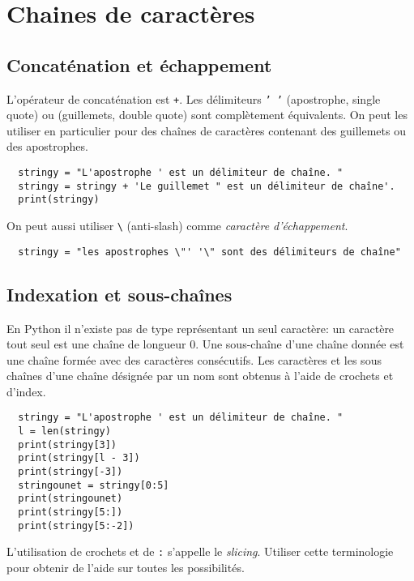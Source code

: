 \section{Chaines de caractères}
\subsection{Concaténation et échappement}
L'opérateur de concaténation est \texttt{+}. Les délimiteurs \texttt{' '} (apostrophe, single quote) ou  (guillemets, double quote) sont complètement équivalents. On peut les utiliser en particulier pour des chaînes de caractères contenant des guillemets ou des apostrophes.
\begin{verbatim}
  stringy = "L'apostrophe ' est un délimiteur de chaîne. " 
  stringy = stringy + 'Le guillemet " est un délimiteur de chaîne'.
  print(stringy)\end{verbatim}
On peut aussi utiliser \verb|\| (anti-slash) comme \emph{caractère d'échappement}. 
\begin{verbatim}
  stringy = "les apostrophes \"' '\" sont des délimiteurs de chaîne"\end{verbatim}

\subsection{Indexation et sous-chaînes}
En Python il n'existe pas de type représentant un seul caractère: un caractère tout seul est une chaîne de longueur 0. Une sous-chaîne d'une chaîne donnée est une chaîne formée avec des caractères consécutifs. Les caractères et les sous chaînes d'une chaîne désignée par un nom sont obtenus à l'aide de crochets et d'index.
\begin{verbatim}
  stringy = "L'apostrophe ' est un délimiteur de chaîne. "
  l = len(stringy)
  print(stringy[3])
  print(stringy[l - 3])
  print(stringy[-3])
  stringounet = stringy[0:5]
  print(stringounet)
  print(stringy[5:])
  print(stringy[5:-2])\end{verbatim}
L'utilisation de crochets et de \verb|:| s'appelle le \emph{slicing}. Utiliser cette terminologie pour obtenir de l'aide sur toutes les possibilités.

